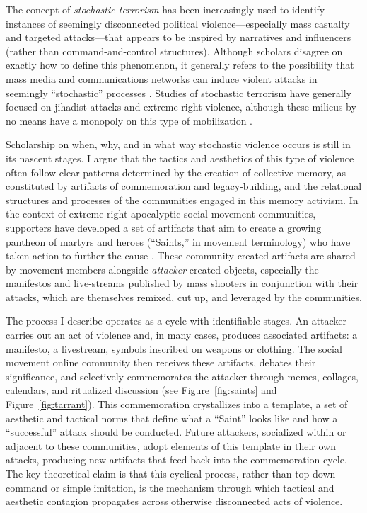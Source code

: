 \documentclass[12pt]{article}
\begin{document}
The concept of \textit{stochastic terrorism} has been increasingly used to identify instances of seemingly disconnected political violence---especially mass casualty and targeted attacks---that appears to be inspired by narratives and influencers (rather than command-and-control structures). Although scholars disagree on exactly how to define this phenomenon, it generally refers to the possibility that mass media and communications networks can induce violent attacks in seemingly ``stochastic'' processes \parencite{braddock2020weaponized}. Studies of stochastic terrorism have generally focused on jihadist attacks and extreme-right violence, although these milieus by no means have a monopoly on this type of mobilization \parencite{amman2021stochastic, angove2024stochastic}.

Scholarship on when, why, and in what way stochastic violence occurs is still in its nascent stages. I argue that the tactics and aesthetics of this type of violence often follow clear patterns determined by the creation of collective memory, as constituted by artifacts of commemoration and legacy-building, and the relational structures and processes of the communities engaged in this memory activism. In the context of extreme-right apocalyptic social movement communities, supporters have developed a set of artifacts that aim to create a growing pantheon of martyrs and heroes (``Saints,'' in movement terminology) who have taken action to further the cause \parencite{macklin2022praise, argentino2024nihilism}. These community-created artifacts are shared by movement members alongside \textit{attacker}-created objects, especially the manifestos and live-streams published by mass shooters in conjunction with their attacks, which are themselves remixed, cut up, and leveraged by the communities.

The process I describe operates as a cycle with identifiable stages. An attacker carries out an act of violence and, in many cases, produces associated artifacts: a manifesto, a livestream, symbols inscribed on weapons or clothing. The social movement online community then receives these artifacts, debates their significance, and selectively commemorates the attacker through memes, collages, calendars, and ritualized discussion (see Figure~\ref{fig:saints} and Figure~\ref{fig:tarrant}). This commemoration crystallizes into a template, a set of aesthetic and tactical norms that define what a ``Saint'' looks like and how a ``successful'' attack should be conducted. Future attackers, socialized within or adjacent to these communities, adopt elements of this template in their own attacks, producing new artifacts that feed back into the commemoration cycle. The key theoretical claim is that this cyclical process, rather than top-down command or simple imitation, is the mechanism through which tactical and aesthetic contagion propagates across otherwise disconnected acts of violence.
\end{document}
